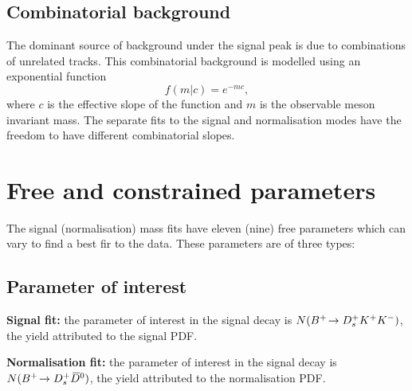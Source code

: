 \subsection{Combinatorial  background}
\label{sec:B2DsKK_combcomps}

The dominant source of background under the signal peak is due to combinations of unrelated tracks. This combinatorial background is modelled using an exponential function 
\begin{equation}
f(m|c) = e^{-mc},
\end{equation}
where $c$ is the effective slope of the function and $m$ is the observable \Bp meson invariant mass. The separate fits to the signal and normalisation modes have the freedom to have different combinatorial slopes.




\section{Free and constrained parameters}


The signal (normalisation) mass fits have eleven (nine) free parameters which can vary to find a best fir to the data. These parameters are of three types:
\subsection{Parameter of interest}
\begin{description}
\item \textbf{Signal fit:} the parameter of interest in the signal decay is $N({{{B}^+}}\!\rightarrow {\ensuremath{{D}^+_{s}}}{\ensuremath{{K}^+}}{\ensuremath{{K}^-}})$, the yield attributed to the signal PDF.

\item \textbf{Normalisation fit:} the parameter of interest in the signal decay is $N({{{B}^+}}\!\rightarrow {\ensuremath{{D}^+_{s}}}{\ensuremath{{\kern 0.2em\overline{\kern -0.2em D}{}}{}^0}})$, the yield attributed to the normalisation PDF. 

\end{description}


